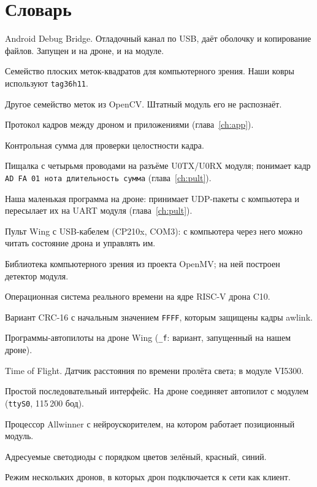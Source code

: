 \chapter{Словарь}

\begin{description}[style=nextline, leftmargin=2em, itemsep=5pt]
  \item[ADB] Android Debug Bridge. Отладочный канал по USB, даёт оболочку и копирование файлов. Запущен и на дроне, и на модуле.
  \item[AprilTag] Семейство плоских меток-квадратов для компьютерного зрения. Наши ковры используют \texttt{tag36h11}.
  \item[ArUco] Другое семейство меток из OpenCV. Штатный модуль его не распознаёт.
  \item[awlink] Протокол кадров между дроном и приложениями (глава~\ref{ch:app}).
  \item[CRC] Контрольная сумма для проверки целостности кадра.
  \item[Зуммер] Пищалка с четырьмя проводами на разъёме U0TX/U0RX модуля; понимает кадр \texttt{AD FA 01 нота длительность сумма} (глава~\ref{ch:pult}).
  \item[Ретранслятор] Наша маленькая программа на дроне: принимает UDP-пакеты с компьютера и пересылает их на UART модуля (глава~\ref{ch:pult}).
  \item[Пульт (USB)] Пульт Wing с USB-кабелем (CP210x, COM3): с компьютера через него можно читать состояние дрона и управлять им.
  \item[imlib] Библиотека компьютерного зрения из проекта OpenMV; на ней построен детектор модуля.
  \item[Melis] Операционная система реального времени на ядре RISC-V дрона C10.
  \item[MCRF4XX] Вариант CRC-16 с начальным значением \texttt{FFFF}, которым защищены кадры awlink.
  \item[\texttt{pilot}, \texttt{pilot\_f}] Программы-автопилоты на дроне Wing (\texttt{\_f}: вариант, запущенный на нашем дроне).
  \item[ToF] Time of Flight. Датчик расстояния по времени пролёта света; в модуле VI5300.
  \item[UART] Простой последовательный интерфейс. На дроне соединяет автопилот с модулем (\texttt{ttyS0}, 115\,200 бод).
  \item[V831] Процессор Allwinner с нейроускорителем, на котором работает позиционный модуль.
  \item[WS2812] Адресуемые светодиоды с порядком цветов зелёный, красный, синий.
  \item[Формация] Режим нескольких дронов, в которых дрон подключается к сети как клиент.
\end{description}
